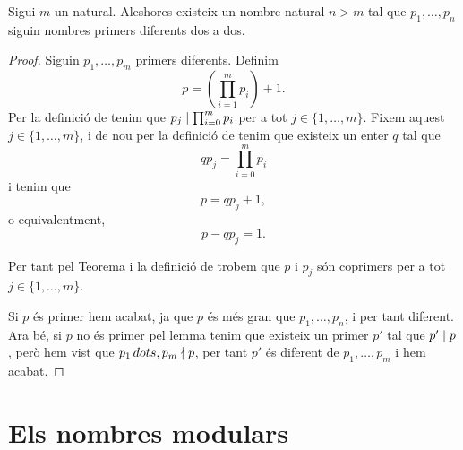 \documentclass[../Apunts.tex]{subfiles}
\begin{document}
	\begin{theorem}
		\label{thm:Teorema d'Euclides}
		Sigui \(m\) un natural. Aleshores existeix un nombre natural \(n>m\) tal que \(p_{1},\dots,p_{n}\) siguin nombres primers diferents dos a dos.
		\begin{proof}
			Siguin \(p_{1},\dots,p_{m}\) primers diferents. Definim
			\[p=\left(\prod_{i=1}^{m}p_{i}\right)+1.\]
			Per la definició de  tenim que \(p_{j}\mathrel{|}\prod_{i=0}^{m}p_{i}\) per a tot \(j\in\{1,\dots,m\}\). Fixem aquest \(j\in\{1,\dots,m\}\), i de nou per la definició de  tenim que existeix un enter \(q\) tal que
			\[qp_{j}=\prod_{i=0}^{m}p_{i}\]
			i tenim que
			\[p=qp_{j}+1,\]
			o equivalentment,
			\[p-qp_{j}=1.\]
			
			Per tant pel Teorema  i la definició de  trobem que \(p\) i \(p_{j}\) són coprimers per a tot \(j\in\{1,\dots,m\}\).
			
			Si \(p\) és primer hem acabat, ja que \(p\) és més gran que \(p_{1},\dots,p_{n}\), i per tant diferent. Ara bé, si \(p\) no és primer pel lemma  tenim que existeix un primer \(p'\) tal que \(p'\mathrel{|} p\), però hem vist que \(p_{1}\,dots,p_{m}\mathrel{\nmid} p\), per tant \(p'\) és diferent de \(p_{1},\dots,p_{m}\) i hem acabat.
		\end{proof}
	\end{theorem}
	\section{Els nombres modulars}
\end{document}
